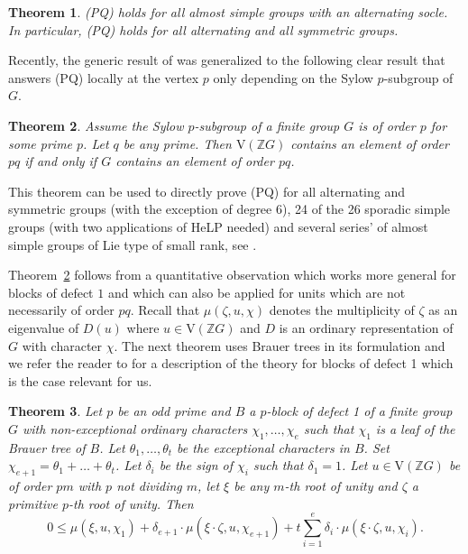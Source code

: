 \documentclass[10pt,a4paper,reqno]{amsart}
\newtheorem{theorem}{Theorem}[section]
\theoremstyle{definition}
\theoremstyle{remark}
\newcommand{\V}{\mathrm{V}}
\newcommand{\ZZ}{\mathbb{Z}}
\begin{document}
{\begin{theorem} \cite{BM19}
(PQ) holds for all almost simple groups with an alternating socle. In particular, (PQ) holds for all alternating and all symmetric groups.           
 \end{theorem}

Recently, the generic result of \cite{BM19} was generalized to the following clear result that answers (PQ) locally at the vertex $p$ only depending on the Sylow $p$-subgroup of $G$.

\begin{theorem}\label{th:block1} \cite{CM19} Assume the Sylow $p$-subgroup of a finite group $G$ is of order $p$ for some prime $p$. Let $q$ be any prime. Then $\V(\ZZ G)$ contains an element of order $pq$ if and only if $G$ contains an element of order $pq$. 
\end{theorem}

This theorem can be used to directly prove (PQ) for all alternating and symmetric groups (with the exception of degree 6), 24 of the 26 sporadic simple groups (with two applications of HeLP needed) and several series' of almost simple groups of Lie type of small rank, see \cite{CM19}.    

Theorem~\ref{th:block1} follows from a quantitative observation which works more general for blocks of defect $1$ and which can also be applied for units which are not necessarily of order $pq$. Recall that $\mu(\zeta,u,\chi)$ denotes the multiplicity of $\zeta$ as an eigenvalue of $D(u)$ where $u \in \V(\ZZ G)$ and $D$ is an ordinary representation of $G$ with character $\chi$. The next theorem uses Brauer trees in its formulation and we refer the reader to \cite[Section 4.12]{LP10} for a description of the theory for blocks of defect 1 which is the case relevant for us. 

\begin{theorem}\label{th:main_inequality}
Let $p$ be an odd prime and $B$ a $p$-block of defect 1 of a finite group $G$ with non-exceptional ordinary characters $\chi_1, \ldots ,\chi_e$  such that $\chi_1$ is a leaf of the Brauer tree of $B$. Let $\theta_1, \ldots ,\theta_t$ be the exceptional characters in $B$. Set $\chi_{e+1}=\theta_1+ \ldots +\theta_t$. Let $\delta_i$ be the sign of $\chi_i$ such that $\delta_{1}=1$. Let $u\in \V(\ZZ G)$ be of order $pm$ with $p$ not dividing $m$, let $\xi$ be any $m$-th root of unity and $\zeta$ a primitive $p$-th root of unity. Then 
$$0 \leqslant \mu(\xi , u, \chi_1) + \delta_{e+1}\cdot \mu(\xi \cdot \zeta, u, \chi_{e+1})+ t \sum_{i=1}^{e}\delta_i\cdot \mu(\xi \cdot \zeta, u, \chi_i).$$ 
\end{theorem}

}
\end{document}
